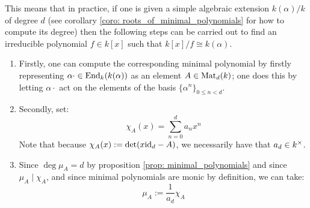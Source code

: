 \begin{remark}
\begin{itemize}
                This means that in practice, if one is given a simple algebraic extension $k(\alpha)/k$ of degree $d$ (see corollary \ref{coro: roots_of_minimal_polynomials} for how to compute its degree) then the following steps can be carried out to find an irreducible polynomial $f \in k[x]$ such that $k[x]/f \cong k(\alpha)$.
                \begin{enumerate}
                    \item Firstly, one can compute the corresponding minimal polynomial by firstly representing $\alpha \cdot \in \mathrm{End}_k(k(\alpha))$ as an element $A \in \mathrm{Mat}_d(k)$; one does this by letting $\alpha \cdot$ act on the elements of the basis $\{\alpha^n\}_{0 \leq n < d}$.
                    \item Secondly, set:
                        $$\chi_A(x) = \sum_{n = 0}^d a_n x^n$$
                    Note that because $\chi_A(x) := \det(x\mathrm{id}_d - A)$, we necessarily have that $a_d \in k^{\x}$.
                    \item Since $\deg \mu_A = d$ by proposition \ref{prop: minimal_polynomials} and since $\mu_A \mid \chi_A$, and since minimal polynomials are monic by definition, we can take:
                        $$\mu_A := \frac{1}{a_d} \chi_A$$
                \end{enumerate}
            \end{itemize}
        \end{remark}
